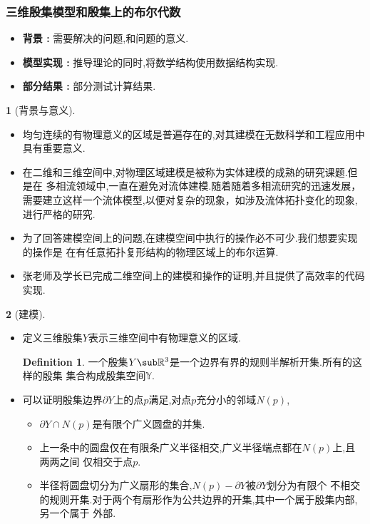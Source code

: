 \documentclass[UTF8]{ctexbeamer}	%
\theoremstyle{plain}
\theoremstyle{definition}
\newtheorem{emt}{}[section]
\newtheorem{defn}{Definition}[section]
\theoremstyle{remark}
\numberwithin{equation}{section}
\begin{document}
\begin{frame}
    \frametitle{三维殷集模型和殷集上的布尔代数}
    \begin{itemize}
        \setlength{\itemsep}{30pt}
        \item \textbf{背景 : } 需要解决的问题,和问题的意义.
        \item \textbf{模型实现 : } 推导理论的同时,将数学结构使用数据结构实现.
        \item  \textbf{部分结果 : } 部分测试计算结果.
    \end{itemize}
\end{frame}

\begin{frame}
    \begin{emt}[背景与意义\cite{2020Boolean}]
        \begin{itemize}
            \item 均匀连续的有物理意义的区域是普遍存在的,对其建模在无数科学和工程应用中具有重要意义.
            \item 在二维和三维空间中,对物理区域建模是被称为实体建模的成熟的研究课题.但是在
            多相流领域中,一直在避免对流体建模.随着随着多相流研究的迅速发展，
            需要建立这样一个流体模型,以便对复杂的现象，如涉及流体拓扑变化的现象,进行严格的研究.
            \item 为了回答建模空间上的问题,在建模空间中执行的操作必不可少.我们想要实现的操作是
            在有任意拓扑复形结构的物理区域上的布尔运算.
            \item 张老师及学长已完成二维空间上的建模和操作的证明,并且提供了高效率的代码实现.
        \end{itemize}
    \end{emt}
\end{frame}

\begin{frame}
    \begin{emt}[建模]
        \begin{itemize}
        \item 定义三维殷集$Y$表示三维空间中有物理意义的区域.
         \begin{defn}
             一个殷集$Y \sub \mathbb{R}^3$是一个边界有界的规则半解析开集.所有的这样的殷集
             集合构成殷集空间$\mathbb{Y}$.
         \end{defn}
        \item 可以证明殷集边界$\partial Y$上的点$p$满足,对点$p$充分小的邻域$N(p)$,
        \begin{itemize}
            \item $\partial Y \cap N(p)$是有限个广义圆盘的并集.
            \item 上一条中的圆盘仅在有限条广义半径相交,广义半径端点都在$N(p)$上,且两两之间
            仅相交于点$p$.
            \item 半径将圆盘切分为广义扇形的集合,$N(p) - \partial Y$被$\partial Y$划分为有限个
            不相交的规则开集.对于两个有扇形作为公共边界的开集,其中一个属于殷集内部,另一个属于
            外部.
        \end{itemize}
        \end{itemize}
    \end{emt}
\end{frame}
\end{document}
